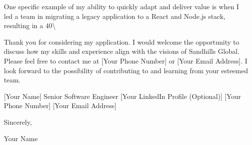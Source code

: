 \documentclass[letterpaper,11pt]{article}
\begin{document}
One specific example of my ability to quickly adapt and deliver value is when I led a team in migrating a legacy application to a React and Node.js stack, resulting in a 40\textbackslash{}%

Thank you for considering my application. I would welcome the opportunity to discuss how my skills and experience align with the visions of Sandhills Global. Please feel free to contact me at [Your Phone Number] or [Your Email Address]. I look forward to the possibility of contributing to and learning from your esteemed team.

[Your Name]  
Senior Software Engineer  
[Your LinkedIn Profile (Optional)]  
[Your Phone Number]  
[Your Email Address]


\vspace{0.25in}

Sincerely,

\vspace{0.5in}

Your Name
\end{document}
